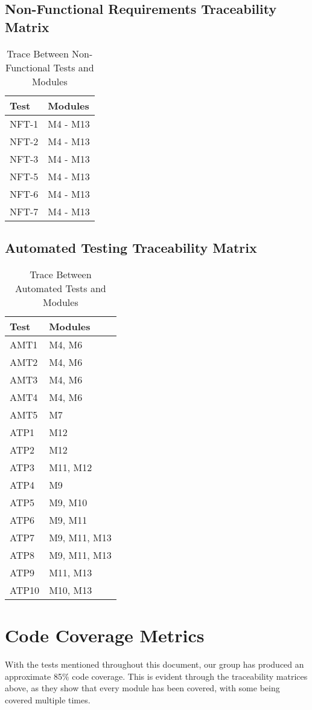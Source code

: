 \documentclass[12pt, titlepage]{article}
\begin{document}
\newpage

\subsection{Non-Functional Requirements Traceability Matrix}
\begin{table}[H]
\centering
\begin{tabular}{p{} p{}}
\toprule
\textbf{Test} & \textbf{Modules}\\
\midrule
NFT-1 & M4 - M13\\
NFT-2 & M4 - M13\\
NFT-3 & M4 - M13\\
NFT-5 & M4 - M13\\
NFT-6 & M4 - M13\\
NFT-7 & M4 - M13\\
\bottomrule
\end{tabular}
\caption{Trace Between Non-Functional Tests and Modules}
\label{TblNFTM}
\end{table}

\newpage

\subsection{Automated Testing Traceability Matrix}
\begin{table}[H]
\centering
\begin{tabular}{p{} p{}}
\toprule
\textbf{Test} & \textbf{Modules}\\
\midrule
AMT1 & M4, M6\\
AMT2 & M4, M6\\
AMT3 & M4, M6\\
AMT4 & M4, M6\\
AMT5 & M7\\
ATP1 & M12 \\
ATP2 & M12 \\
ATP3 & M11, M12 \\
ATP4 & M9 \\
ATP5 & M9, M10 \\
ATP6 & M9, M11 \\
ATP7 & M9, M11, M13 \\
ATP8 & M9, M11, M13 \\
ATP9 & M11, M13 \\
ATP10 & M10, M13 \\
\bottomrule
\end{tabular}
\caption{Trace Between Automated Tests and Modules}
\label{TblATM}
\end{table}

\newpage
	
\section{Code Coverage Metrics}					%

With the tests mentioned throughout this document, our group has produced an approximate 85\% code coverage. This is evident through the traceability matrices above, as they show that every module has been covered, with some being covered multiple times.
\end{document}
